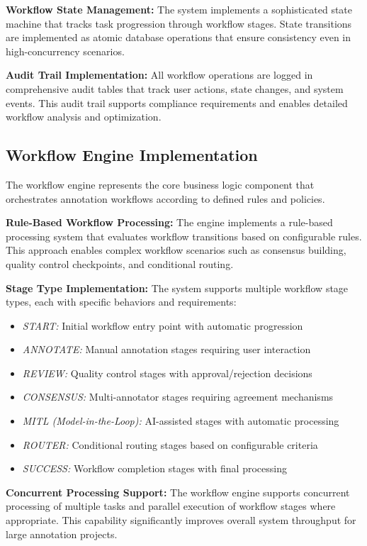 \textbf{Workflow State Management:} The system implements a sophisticated state machine that tracks task progression through workflow stages. State transitions are implemented as atomic database operations that ensure consistency even in high-concurrency scenarios.

\textbf{Audit Trail Implementation:} All workflow operations are logged in comprehensive audit tables that track user actions, state changes, and system events. This audit trail supports compliance requirements and enables detailed workflow analysis and optimization.

\subsection{Workflow Engine Implementation}

The workflow engine represents the core business logic component that orchestrates annotation workflows according to defined rules and policies.

\textbf{Rule-Based Workflow Processing:} The engine implements a rule-based processing system that evaluates workflow transitions based on configurable rules. This approach enables complex workflow scenarios such as consensus building, quality control checkpoints, and conditional routing.

\textbf{Stage Type Implementation:} The system supports multiple workflow stage types, each with specific behaviors and requirements:

\begin{itemize}
    \item \textit{START:} Initial workflow entry point with automatic progression
    \item \textit{ANNOTATE:} Manual annotation stages requiring user interaction
    \item \textit{REVIEW:} Quality control stages with approval/rejection decisions
    \item \textit{CONSENSUS:} Multi-annotator stages requiring agreement mechanisms
    \item \textit{MITL (Model-in-the-Loop):} AI-assisted stages with automatic processing
    \item \textit{ROUTER:} Conditional routing stages based on configurable criteria
    \item \textit{SUCCESS:} Workflow completion stages with final processing
\end{itemize}

\textbf{Concurrent Processing Support:} The workflow engine supports concurrent processing of multiple tasks and parallel execution of workflow stages where appropriate. This capability significantly improves overall system throughput for large annotation projects.

